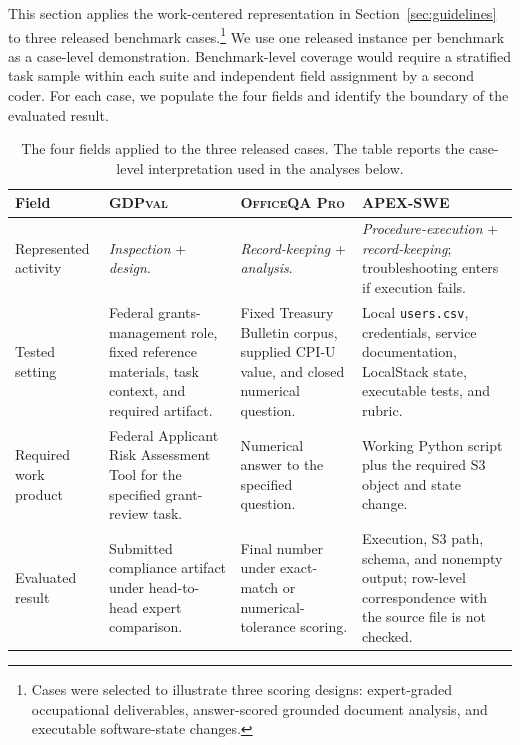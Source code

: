\documentclass[10pt]{article}
\begin{document}
This section applies the work-centered representation in Section~\ref{sec:guidelines} to three released benchmark cases.\footnote{Cases were selected to illustrate three scoring designs: expert-graded occupational deliverables, answer-scored grounded document analysis, and executable software-state changes.} We use one released instance per benchmark as a case-level demonstration. Benchmark-level coverage would require a stratified task sample within each suite and independent field assignment by a second coder. For each case, we populate the four fields and identify the boundary of the evaluated result.

\begin{table}[!ht]
\caption{The four fields applied to the three released cases. The table reports the case-level interpretation used in the analyses below.}
\label{tab:case-comparison}
\centering
\footnotesize
\setlength{\tabcolsep}{4pt}
\renewcommand{\arraystretch}{1.12}
\begin{tabularx}{\textwidth}{@{}p{}X X X@{}}
\toprule
\textbf{Field} & \textbf{\textsc{GDPval}} & \textbf{\textsc{OfficeQA Pro}} & \textbf{\textsc{APEX-SWE}} \\
\midrule
Represented activity & \emph{Inspection} + \emph{design}. & \emph{Record-keeping} + \emph{analysis}. & \emph{Procedure-execution} + \emph{record-keeping}; troubleshooting enters if execution fails. \\
Tested setting & Federal grants-management role, fixed reference materials, task context, and required artifact. & Fixed Treasury Bulletin corpus, supplied CPI-U value, and closed numerical question. & Local \texttt{users.csv}, credentials, service documentation, LocalStack state, executable tests, and rubric. \\
Required work product & Federal Applicant Risk Assessment Tool for the specified grant-review task. & Numerical answer to the specified question. & Working Python script plus the required S3 object and state change. \\
Evaluated result & Submitted compliance artifact under head-to-head expert comparison. & Final number under exact-match or numerical-tolerance scoring. & Execution, S3 path, schema, and nonempty output; row-level correspondence with the source file is not checked. \\
\bottomrule
\end{tabularx}
\end{table}
\end{document}
